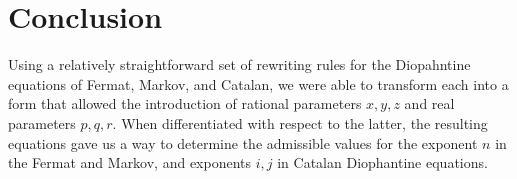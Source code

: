 \documentclass[11pt]{article}
\begin{document}
\section{Conclusion}


Using a relatively straightforward set of rewriting ru\-les for the Diopahntine equations of Fermat, Markov, and
Catalan, we were able to transform each into a form that allowed the introduction of rational parameters 
$x, y, z$ and real parameters $p, q, r$\@. When differentiated with respect to the latter, the resulting equations gave us a way to determine the admissible values for the exponent $n$ in the Fermat and Markov, and exponents $i, j$ in Catalan Diophantine equations.







\end{document}
